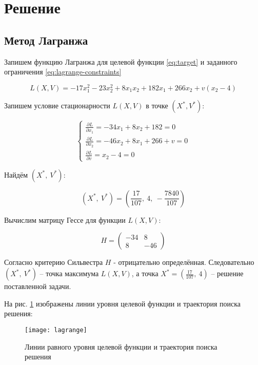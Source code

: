 \section{Решение}

\subsection{Метод Лагранжа}

Запишем функцию Лагранжа для целевой функции \ref{eq:target} и заданного ограничения \ref{eq:lagrange-constraints}

\begin{equation*}
	L(X, V) = -17 x^2_1 - 23 x^2_2 + 8 x_1 x_2 + 182 x_1 + 266 x_2 + v(x_2 - 4)
\end{equation*}

Запишем условие стационарности $L(X, V)$ в точке $(X^*, V^*)$:

\begin{equation*}
	\begin{cases}
		\frac{\partial L}{\partial x_1} = -34 x_1 + 8 x_2 + 182 = 0
		\\
		\frac{\partial L}{\partial x_2} = -46 x_2 + 8 x_1 + 266 + v = 0
		\\
		\frac{\partial L}{\partial v} = x_2 - 4 = 0
	\end{cases}
\end{equation*}

Найдём $(X^*,\ V^*)$:

\begin{equation*}
	(X^*,\ V^*) = \left( \frac{17}{107},\ 4,\ -\frac{7840}{107} \right)
\end{equation*}

Вычислим матрицу Гессе для функции $L(X, V)$:

\begin{equation*}
	H = \begin{pmatrix}
		-34 & 8
		\\
		8 & -46
	\end{pmatrix}
\end{equation*}

Согласно критерию Сильвестра $H$ - отрицательно определённая. Следовательно $(X^*,\ V^*)$ -- точка максимума $L(X, V)$, а точка $X^* = \left(\frac{17}{107},\ 4 \right)$ -- решение поставленной задачи.

На рис. \ref{pic:lagrange} изображены линии уровня целевой функции и траектория поиска решения:

\begin{figure}[H]
\begin{center}
	\texttt{[image: lagrange]}
	\caption{Линии равного уровня целевой функции и траектория поиска решения}
	\label{pic:lagrange}
\end{center}
\end{figure}

